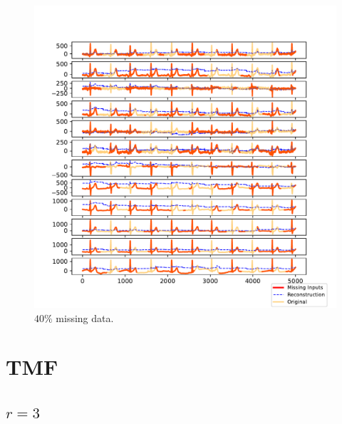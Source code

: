 \documentclass{mldsmsc}
\begin{document}
\begin{figure}[H]
\vspace{1em} %

\begin{minipage}{0.4\linewidth}
    \centering
    \includegraphics[width=\linewidth]{images/missing/mlesmf_output_40_10.pdf}
    \caption{$40\%$ missing data.}
\end{minipage}
\end{figure}

\section{TMF}

\subsection{$r = 3$}
\end{document}
